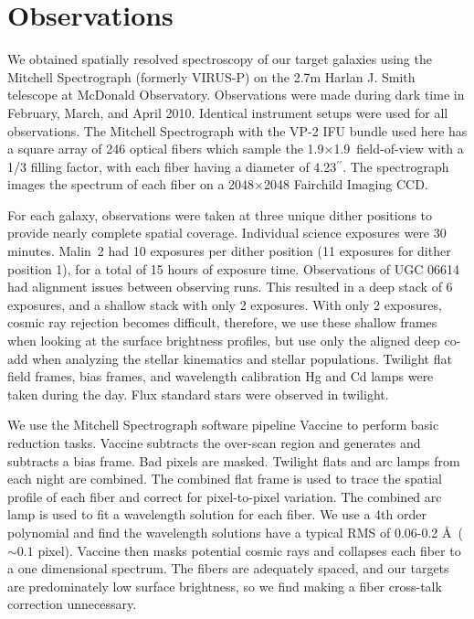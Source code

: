 \documentclass{emulateapj}
\def\arcsec{$^{\prime\prime}$}
\begin{document}

\section{Observations}

We obtained spatially resolved spectroscopy of our target galaxies using the Mitchell Spectrograph (formerly VIRUS-P)\citep{Hill08} on the 2.7m Harlan J. Smith telescope at McDonald Observatory.  Observations were made during dark time in February, March, and April 2010.  Identical instrument setups were used for all observations.  The Mitchell Spectrograph with the VP-2 IFU bundle used here has a square array of 246 optical fibers which sample the 1.9\arcmin$\times$1.9\arcmin\ field-of-view with a 1/3 filling factor, with each fiber having a diameter of 4.23\arcsec.  The spectrograph images the spectrum of each fiber on a 2048$\times$2048 Fairchild Imaging CCD.  

For each galaxy, observations were taken at three unique dither positions to provide nearly complete spatial coverage.  Individual science exposures were 30 minutes.  Malin~2 had 10 exposures per dither position (11 exposures for dither position 1), for a total of 15 hours of exposure time.  Observations of UGC 06614 had alignment issues between observing runs.  This resulted in a deep stack of 6 exposures, and a shallow stack with only 2 exposures.  With only 2 exposures, cosmic ray rejection becomes difficult, therefore, we use these shallow frames when looking at the surface brightness profiles, but use only the aligned deep co-add when analyzing the stellar kinematics and stellar populations. Twilight flat field frames, bias frames, and wavelength calibration Hg and Cd lamps were taken during the day.  Flux standard stars were observed in twilight.  


We use the Mitchell Spectrograph software pipeline Vaccine \citep{Adams2011} to perform basic reduction tasks.  Vaccine subtracts the over-scan region and generates and subtracts a bias frame.  Bad pixels are masked.  Twilight flats and arc lamps from each night are combined.  The combined flat frame is used to trace the spatial profile of each fiber and correct for pixel-to-pixel variation.  The combined arc lamp is used to fit a wavelength solution for each fiber.  We use a 4th order polynomial and find the wavelength solutions have a typical RMS of 0.06-0.2 \AA\ ($\sim0.1$ pixel).  Vaccine then masks potential cosmic rays and collapses each fiber to a one dimensional spectrum.  The fibers are adequately spaced, and our targets are predominately low surface brightness, so we find making a fiber cross-talk correction unnecessary.
\end{document}
